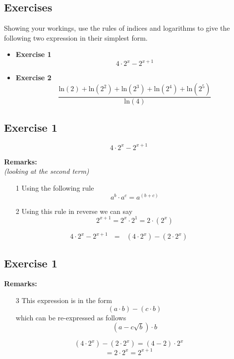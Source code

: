 \documentclass[]{report}
\begin{document}


\subsection{Exercises}

Showing your workings, use the rules of indices and logarithms to give the following two expression in their simplest form.
\bigskip
\begin{itemize}
\item \textbf{Exercise 1}
\[ 4 \cdot 2^x - 2^{x+1} \]
\item \textbf{Exercise 2}
\[  \frac{\mbox{ln}(2) + \mbox{ln}(2^2) + \mbox{ln}(2^3)  + \mbox{ln}(2^4) + \mbox{ln}(2^5)  }  {\mbox{ln}(4)}  \]
\end{itemize}

\subsection{Exercise 1}

\[ 4 \cdot 2^x - 2^{x+1} \]

\textbf{Remarks:}\\
\textit{(looking at the second term)}
\begin{itemize}
\item[1] Using the following rule
\[ a^b \cdot a^c = a^{(b+c)}  \] 
\item[2] Using this rule in reverse we can say
\[ 2^{x+1} = 2^x \cdot 2^1  = 2\cdot (2^x) \] 
\end{itemize}
\[ 4 \cdot 2^x - 2^{x+1} \mbox{   } = \mbox{   } (4 \cdot 2^x) -  (2\cdot 2^{x}) \]

\subsection{Exercise 1}


\textbf{Remarks:}
\begin{itemize}
\item[3] This expression is in the form 
\[ (a  \cdot b ) - ( c  \cdot b) \]
which can be re-expressed as follows 
\[ (a - c\sqrt{b} )  \cdot b \]
\end{itemize}
\[ (4 \cdot 2^x) -  (2\cdot 2^{x}) = (4-2)  \cdot 2^{x} \]
\[   = 2 \cdot 2^x = 2^{x+1}\]
\end{document}
